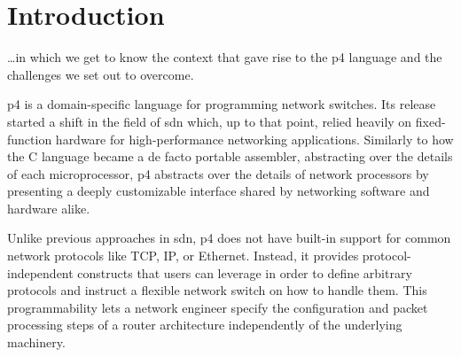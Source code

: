 \chapter*{Introduction}

\begin{chapterabstract}
	\dots in which we get to know the context that gave rise to the
	\acrshort{p4} language and the challenges we set out to overcome.
\end{chapterabstract}

\acrfull{p4} is a domain-specific language for programming network switches. Its
release started a shift in the field of \acrfull{sdn} which, up to that point,
relied heavily on fixed-function hardware for high-performance networking
applications. Similarly to how the C language became a de facto portable
assembler, abstracting over the details of each microprocessor, \acrshort{p4}
abstracts over the details of network processors by presenting a deeply
customizable interface shared by networking software and hardware alike.

Unlike previous approaches in \acrshort{sdn}, \acrshort{p4} does not have
built-in support for common network protocols like TCP, IP, or Ethernet.
Instead, it provides protocol-independent constructs that users can leverage in
order to define arbitrary protocols and instruct a flexible network switch on
how to handle them. This programmability lets a network engineer specify the
configuration and packet processing steps of a router architecture independently
of the underlying machinery.


